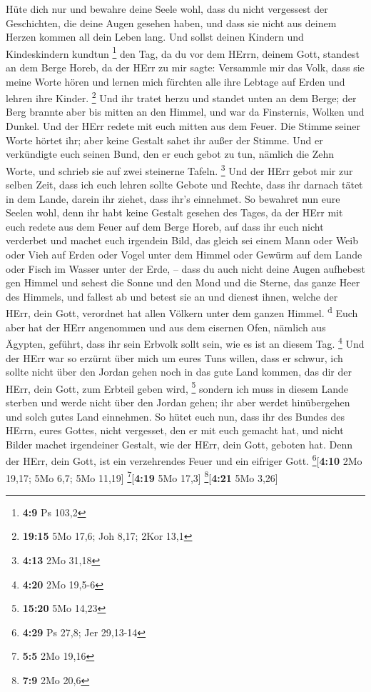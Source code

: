  Hüte dich nur und bewahre deine Seele wohl, dass du nicht
vergessest der Geschichten, die deine Augen gesehen haben, und dass sie
nicht aus deinem Herzen kommen all dein Leben lang. Und sollst deinen
Kindern und Kindeskindern kundtun \footnote{\textbf{4:9} Ps 103,2}
 den Tag, da du vor dem HErrn, deinem Gott, standest an
dem Berge Horeb, da der HErr zu mir sagte: Versammle mir das Volk, dass
sie meine Worte hören und lernen mich fürchten alle ihre Lebtage auf
Erden und lehren ihre Kinder. \footnote{\textbf{19:15} 5Mo 17,6; Joh
  8,17; 2Kor 13,1}  Und ihr tratet herzu und standet
unten an dem Berge; der Berg brannte aber bis mitten an den Himmel, und
war da Finsternis, Wolken und Dunkel.  Und der HErr
redete mit euch mitten aus dem Feuer. Die Stimme seiner Worte hörtet
ihr; aber keine Gestalt sahet ihr außer der Stimme.  Und
er verkündigte euch seinen Bund, den er euch gebot zu tun, nämlich die
Zehn Worte, und schrieb sie auf zwei steinerne Tafeln. \footnote{\textbf{4:13}
  2Mo 31,18}  Und der HErr gebot mir zur selben Zeit,
dass ich euch lehren sollte Gebote und Rechte, dass ihr darnach tätet in
dem Lande, darein ihr ziehet, dass ihr's einnehmet.  So
bewahret nun eure Seelen wohl, denn ihr habt keine Gestalt gesehen des
Tages, da der HErr mit euch redete aus dem Feuer auf dem Berge Horeb,
 auf dass ihr euch nicht verderbet und machet euch
irgendein Bild, das gleich sei einem Mann oder Weib  oder
Vieh auf Erden oder Vogel unter dem Himmel  oder Gewürm
auf dem Lande oder Fisch im Wasser unter der Erde, -- 
dass du auch nicht deine Augen aufhebest gen Himmel und sehest die Sonne
und den Mond und die Sterne, das ganze Heer des Himmels, und fallest ab
und betest sie an und dienest ihnen, welche der HErr, dein Gott,
verordnet hat allen Völkern unter dem ganzen Himmel. \textsuperscript{d}
 Euch aber hat der HErr angenommen und aus dem eisernen
Ofen, nämlich aus Ägypten, geführt, dass ihr sein Erbvolk sollt sein,
wie es ist an diesem Tag. \footnote{\textbf{4:20} 2Mo 19,5-6}
 Und der HErr war so erzürnt über mich um eures Tuns
willen, dass er schwur, ich sollte nicht über den Jordan gehen noch in
das gute Land kommen, das dir der HErr, dein Gott, zum Erbteil geben
wird, \footnote{\textbf{15:20} 5Mo 14,23}  sondern ich
muss in diesem Lande sterben und werde nicht über den Jordan gehen; ihr
aber werdet hinübergehen und solch gutes Land einnehmen. 
So hütet euch nun, dass ihr des Bundes des HErrn, eures Gottes, nicht
vergesset, den er mit euch gemacht hat, und nicht Bilder machet
irgendeiner Gestalt, wie der HErr, dein Gott, geboten hat.
 Denn der HErr, dein Gott, ist ein verzehrendes Feuer und
ein eifriger Gott. \footnote{\textbf{4:29} Ps 27,8; Jer 29,13-14}{[}\textbf{4:10}
2Mo 19,17; 5Mo 6,7; 5Mo 11,19{]} \footnote{\textbf{5:5} 2Mo 19,16}{[}\textbf{4:19}
5Mo 17,3{]} \footnote{\textbf{7:9} 2Mo 20,6}{[}\textbf{4:21} 5Mo 3,26{]}

